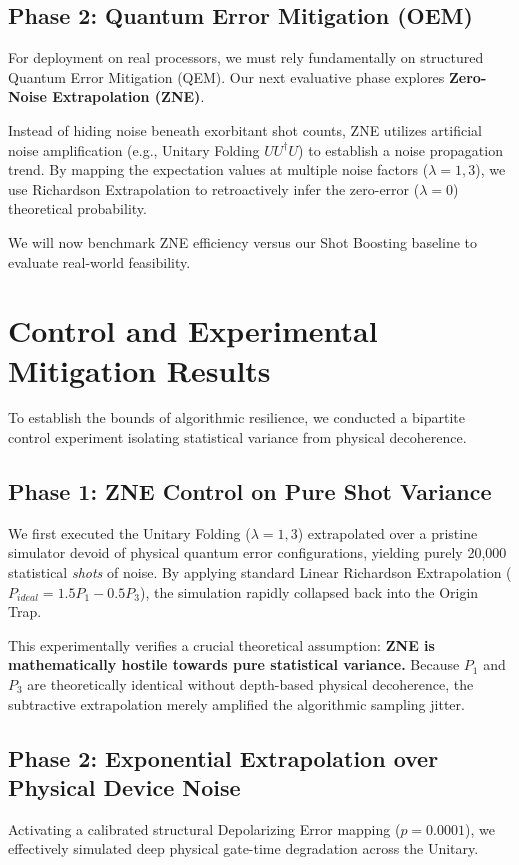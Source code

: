 \documentclass[11pt,a4paper]{article}
\begin{document}
\subsection{Phase 2: Quantum Error Mitigation (OEM)}
For deployment on real processors, we must rely fundamentally on structured Quantum Error Mitigation (QEM). Our next evaluative phase explores \textbf{Zero-Noise Extrapolation (ZNE)}. 

Instead of hiding noise beneath exorbitant shot counts, ZNE utilizes artificial noise amplification (e.g., Unitary Folding $UU^\dag U$) to establish a noise propagation trend. By mapping the expectation values at multiple noise factors ($\lambda = 1, 3$), we use Richardson Extrapolation to retroactively infer the zero-error ($\lambda = 0$) theoretical probability.

We will now benchmark ZNE efficiency versus our Shot Boosting baseline to evaluate real-world feasibility.

\section{Control and Experimental Mitigation Results}
To establish the bounds of algorithmic resilience, we conducted a bipartite control experiment isolating statistical variance from physical decoherence.

\subsection{Phase 1: ZNE Control on Pure Shot Variance}
We first executed the Unitary Folding ($\lambda=1, 3$) extrapolated over a pristine simulator devoid of physical quantum error configurations, yielding purely 20,000 statistical \textit{shots} of noise. By applying standard Linear Richardson Extrapolation ($P_{ideal} = 1.5 P_1 - 0.5 P_3$), the simulation rapidly collapsed back into the Origin Trap. 

This experimentally verifies a crucial theoretical assumption: \textbf{ZNE is mathematically hostile towards pure statistical variance.} Because $P_1$ and $P_3$ are theoretically identical without depth-based physical decoherence, the subtractive extrapolation merely amplified the algorithmic sampling jitter.

\subsection{Phase 2: Exponential Extrapolation over Physical Device Noise}
Activating a calibrated structural Depolarizing Error mapping ($p=0.0001$), we effectively simulated deep physical gate-time degradation across the Unitary.
\end{document}

